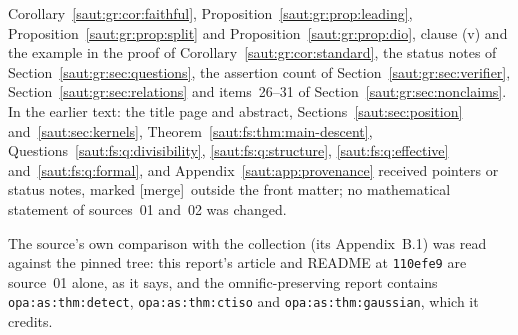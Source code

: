 \documentclass[11pt]{article}
\theoremstyle{definition}
\theoremstyle{remark}
\newcommand{\lbl}[1]{\nolinkurl{#1}}%
\newcommand{\mergetag}{\textup{[merge]}}
\numberwithin{equation}{section}
\begin{document}
\begin{enumerate}[label=(\arabic*)]
Corollary~\ref{saut:gr:cor:faithful}, Proposition~\ref{saut:gr:prop:leading},
Proposition~\ref{saut:gr:prop:split} and Proposition~\ref{saut:gr:prop:dio}, clause (v)
and the example in the proof of Corollary~\ref{saut:gr:cor:standard}, the status notes of
Section~\ref{saut:gr:sec:questions}, the assertion count of
Section~\ref{saut:gr:sec:verifier}, Section~\ref{saut:gr:sec:relations} and items~26--31
of Section~\ref{saut:gr:sec:nonclaims}. In the earlier text: the title page and
abstract, Sections~\ref{saut:sec:position} and~\ref{saut:sec:kernels},
Theorem~\ref{saut:fs:thm:main-descent}, Questions~\ref{saut:fs:q:divisibility},
\ref{saut:fs:q:structure}, \ref{saut:fs:q:effective} and~\ref{saut:fs:q:formal}, and
Appendix~\ref{saut:app:provenance} received pointers or status notes, marked \mergetag\
outside the front matter; no mathematical statement of sources~01 and~02 was changed.
\end{enumerate}
The source's own comparison with the collection (its Appendix~B.1) was read against the
pinned tree: this report's article and README at \texttt{110efe9} are source~01 alone, as
it says, and the omnific-preserving report contains \lbl{opa:as:thm:detect},
\lbl{opa:as:thm:ctiso} and \lbl{opa:as:thm:gaussian}, which it credits.
\end{document}
